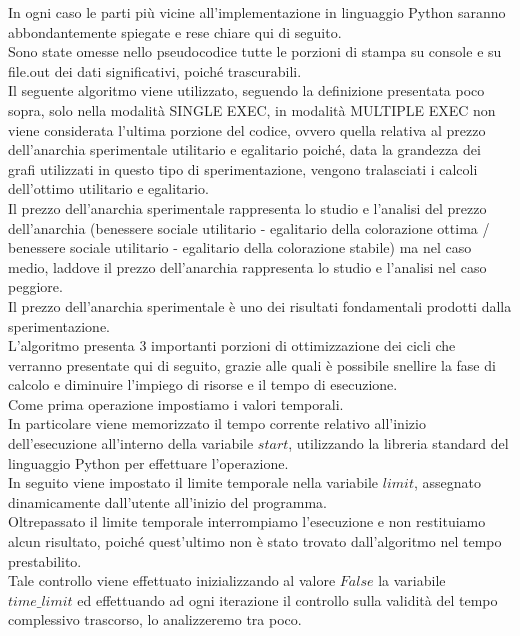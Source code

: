 In ogni caso le parti più vicine all'implementazione in linguaggio Python saranno abbondantemente spiegate e rese chiare qui di seguito.\\

Sono state omesse nello pseudocodice tutte le porzioni di stampa su console e su file.out dei dati significativi, poiché trascurabili.\\

Il seguente algoritmo viene utilizzato, seguendo la definizione presentata poco sopra, solo nella modalità SINGLE EXEC, in modalità MULTIPLE EXEC non viene considerata l'ultima porzione del codice, ovvero quella relativa al prezzo dell'anarchia sperimentale utilitario e egalitario poiché, data la grandezza dei grafi utilizzati in questo tipo di sperimentazione, vengono tralasciati i calcoli dell'ottimo utilitario e egalitario.\\

Il prezzo dell'anarchia sperimentale rappresenta lo studio e l'analisi del prezzo dell'anarchia (benessere sociale utilitario - egalitario della colorazione ottima / benessere sociale utilitario - egalitario della colorazione stabile) ma nel caso medio, laddove il prezzo dell'anarchia rappresenta lo studio e l'analisi nel caso peggiore.\\
Il prezzo dell'anarchia sperimentale è uno dei risultati fondamentali prodotti dalla sperimentazione.\\

L'algoritmo presenta 3 importanti porzioni di ottimizzazione dei cicli che verranno presentate qui di seguito, grazie alle quali è possibile snellire la fase di calcolo e diminuire l'impiego di risorse e il tempo di esecuzione.\\

Come prima operazione impostiamo i valori temporali.\\
In particolare viene memorizzato il tempo corrente relativo all'inizio dell'esecuzione all'interno della variabile $start$, utilizzando la libreria standard del linguaggio Python per effettuare l'operazione.\\
In seguito viene impostato il limite temporale nella variabile $limit$, assegnato dinamicamente dall'utente all'inizio del programma.\\
Oltrepassato il limite temporale interrompiamo l'esecuzione e non restituiamo alcun risultato, poiché quest'ultimo non è stato trovato dall'algoritmo nel tempo prestabilito.\\
Tale controllo viene effettuato inizializzando al valore $False$ la variabile $time\_limit$ ed effettuando ad ogni iterazione il controllo sulla validità del tempo complessivo trascorso, lo analizzeremo tra poco.\\

